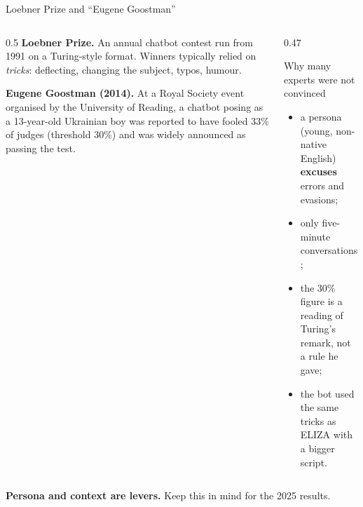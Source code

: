 \begin{frame}{Loebner Prize and ``Eugene Goostman''}
\begin{columns}[T]
\begin{column}{0.5\textwidth}
\small
\textbf{Loebner Prize.} An annual chatbot contest run from 1991 on a Turing-style format. Winners typically relied on \emph{tricks}: deflecting, changing the subject, typos, humour.

\vspace{2mm}
\textbf{Eugene Goostman (2014).} At a Royal Society event organised by the University of Reading, a chatbot posing as a 13-year-old Ukrainian boy was reported to have fooled 33\% of judges (threshold 30\%) and was widely announced as passing the test.

\vspace{2mm}
\begin{sfig}[0.2]\end{sfig}
\end{column}
\begin{column}{0.47\textwidth}
\begin{block}{Why many experts were not convinced}
{\small
\begin{itemize}\setlength\itemsep{2pt}
\item a persona (young, non-native English) \textbf{excuses} errors and evasions;
\item only five-minute conversations;
\item the 30\% figure is a reading of Turing's remark, not a rule he gave;
\item the bot used the same tricks as ELIZA with a bigger script.
\end{itemize}}
\end{block}
\end{column}
\end{columns}
\vspace{1mm}
{\small \textbf{Persona and context are levers.} Keep this in mind for the 2025 results.}
\end{frame}

